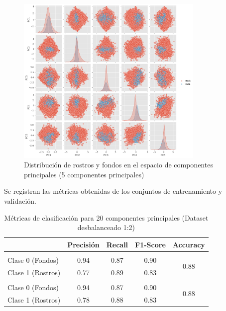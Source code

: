 \documentclass{article}
\begin{document}
\begin{figure}[H]
    \centering
    \includegraphics[width=0.8\textwidth]{tarea_2/imagenes/pca_classes_x2_v1_20_5_components.png}
    \caption{Distribución de rostros y fondos en el espacio de componentes principales (5 componentes principales)}
    \label{fig:pca_classes}
\end{figure}

Se registran las métricas obtenidas de los conjuntos de entrenamiento y validación.

\begin{table}[H]
    \centering
    \begin{tabular}{|>{\centering\arraybackslash}m{3.2cm}|c|c|c|c|}
    \hline
    \rowcolor{tableblue} \multicolumn{1}{|c|}{\textbf{Conjunto}} & \textbf{Precisión} & \textbf{Recall} & \textbf{F1-Score} & \textbf{Accuracy} \\
    \hline
    \multicolumn{5}{|c|}{\textbf{Entrenamiento}} \\
    \hline
    Clase 0 (Fondos) & 0.94 & 0.87 & 0.90 & \multirow{2}{*}{0.88} \\
    Clase 1 (Rostros) & 0.77 & 0.89 & 0.83 & \\
    \hline
    \multicolumn{5}{|c|}{\textbf{Validación}} \\
    \hline
    Clase 0 (Fondos) & 0.94 & 0.87 & 0.90 & \multirow{2}{*}{0.88} \\
    Clase 1 (Rostros) & 0.78 & 0.88 & 0.83 & \\
    \hline
    \end{tabular}
    \caption{Métricas de clasificación para 20 componentes principales (Dataset desbalanceado 1:2)}
    \label{tab:pca_x2_metrics}
\end{table}
\end{document}
